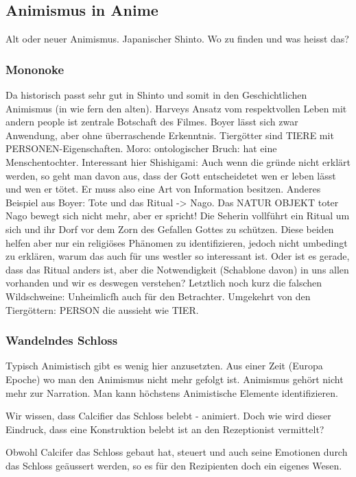 \subsection{Animismus in Anime}
Alt oder neuer Animismus. Japanischer Shinto. Wo zu finden und was heisst das?

\subsubsection*{Mononoke}
Da historisch passt sehr gut in Shinto und somit in den Geschichtlichen Animismus (in wie fern den alten). Harveys Ansatz vom respektvollen Leben mit andern people ist zentrale Botschaft des Filmes. Boyer lässt sich zwar Anwendung, aber ohne überraschende Erkenntnis. Tiergötter sind TIERE mit PERSONEN-Eigenschaften. Moro: ontologischer Bruch: hat eine Menschentochter. Interessant hier Shishigami: Auch wenn die gründe nicht erklärt werden, so geht man davon aus, dass der Gott entscheidetet wen er leben lässt und wen er tötet. Er muss also eine Art von Information besitzen. Anderes Beispiel aus Boyer: Tote und das Ritual -> Nago. Das NATUR OBJEKT toter Nago bewegt sich nicht mehr, aber er spricht! Die Seherin vollführt ein Ritual um sich und ihr Dorf vor dem Zorn des Gefallen Gottes zu schützen. Diese beiden helfen aber nur ein religiöses Phänomen zu identifizieren, jedoch nicht umbedingt zu erklären, warum das auch für uns westler so interessant ist. Oder ist es gerade, dass das Ritual anders ist, aber die Notwendigkeit (Schablone davon) in uns allen vorhanden und wir es deswegen verstehen? Letztlich noch kurz die falschen Wildschweine: Unheimlicfh auch für den Betrachter. Umgekehrt von den Tiergöttern: PERSON die aussieht wie TIER.

\subsubsection*{Wandelndes Schloss}
Typisch Animistisch gibt es wenig hier anzusetzten. Aus einer Zeit (Europa Epoche) wo man den Animismus nicht mehr gefolgt ist. Animismus gehört nicht mehr zur Narration. Man kann höchstens Animistische Elemente identifizieren. 

Wir wissen, dass Calcifier das Schloss belebt - animiert. Doch wie wird dieser Eindruck, dass eine Konstruktion belebt ist an den Rezeptionist vermittelt?

Obwohl Calcifer das Schloss gebaut hat, steuert und auch seine Emotionen durch das Schloss geäussert werden, so es für den Rezipienten doch ein eigenes Wesen.


